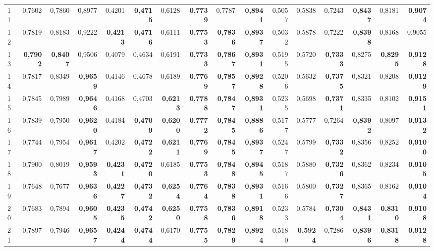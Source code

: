\begin{table}[htp!]
\begin{adjustwidth}{-2cm}{}
\begin{tabular}{ l | *{15}{| r}}
11	&	0,7602	&	0,7860	&	0,8977	&	0,4201	&	\textbf{0,4715}	&	0,6128	&	\textbf{0,7739}	&	0,7787	&	\textbf{0,8941}	&	0,5057	&	0,5838	&	0,7243	&	\textbf{0,8437}	&	0,8181	&	\textbf{0,9074}	\\
12	&	0,7819	&	0,8183	&	0,9222	&	\textbf{0,4213}	&	\textbf{0,4716}	&	0,6111	&	\textbf{0,7753}	&	\textbf{0,7836}	&	\textbf{0,8937}	&	0,5032	&	0,5878	&	0,7222	&	\textbf{0,8398}	&	0,8168	&	0,9055	\\
13	&	\textbf{0,7902}	&	\textbf{0,8407}	&	0,9506	&	0,4079	&	0,4634	&	0,6191	&	\textbf{0,7733}	&	\textbf{0,7867}	&	\textbf{0,8931}	&	0,5195	&	0,5720	&	\textbf{0,7333}	&	0,8275	&	\textbf{0,8295}	&	\textbf{0,9128}	\\
14	&	0,7817	&	0,8349	&	\textbf{0,9659}	&	0,4146	&	0,4678	&	0,6189	&	\textbf{0,7769}	&	\textbf{0,7857}	&	\textbf{0,8928}	&	0,5206	&	0,5632	&	\textbf{0,7375}	&	0,8321	&	0,8208	&	\textbf{0,9129}	\\
15	&	0,7845	&	0,7989	&	\textbf{0,9646}	&	0,4168	&	0,4703	&	\textbf{0,6213}	&	\textbf{0,7788}	&	\textbf{0,7847}	&	\textbf{0,8931}	&	0,5235	&	0,5698	&	\textbf{0,7371}	&	0,8335	&	0,8102	&	\textbf{0,9151}	\\
16	&	0,7839	&	0,7950	&	\textbf{0,9620}	&	0,4184	&	\textbf{0,4709}	&	\textbf{0,6200}	&	\textbf{0,7772}	&	\textbf{0,7845}	&	\textbf{0,8886}	&	0,5177	&	0,5777	&	0,7264	&	\textbf{0,8392}	&	0,8097	&	\textbf{0,9132}	\\
17	&	0,7744	&	0,7954	&	\textbf{0,9617}	&	0,4202	&	\textbf{0,4722}	&	\textbf{0,6211}	&	\textbf{0,7769}	&	\textbf{0,7845}	&	\textbf{0,8937}	&	0,5247	&	0,5799	&	\textbf{0,7332}	&	0,8356	&	0,8252	&	\textbf{0,9100}	\\
18	&	0,7900	&	0,8019	&	\textbf{0,9593}	&	\textbf{0,4231}	&	\textbf{0,4720}	&	0,6185	&	\textbf{0,7753}	&	\textbf{0,7848}	&	\textbf{0,8945}	&	0,5187	&	0,5880	&	\textbf{0,7326}	&	0,8362	&	0,8234	&	\textbf{0,9105}	\\
19	&	0,7648	&	0,7677	&	\textbf{0,9636}	&	\textbf{0,4227}	&	\textbf{0,4732}	&	\textbf{0,6254}	&	\textbf{0,7764}	&	\textbf{0,7838}	&	\textbf{0,8931}	&	0,5166	&	0,5800	&	\textbf{0,7327}	&	0,8365	&	0,8162	&	\textbf{0,9104}	\\
20	&	0,7683	&	0,7894	&	\textbf{0,9605}	&	\textbf{0,4235}	&	\textbf{0,4742}	&	\textbf{0,6250}	&	\textbf{0,7758}	&	\textbf{0,7836}	&	\textbf{0,8918}	&	0,5233	&	0,5784	&	\textbf{0,7304}	&	\textbf{0,8431}	&	\textbf{0,8310}	&	\textbf{0,9108}	\\
21	&	0,7897	&	0,7946	&	\textbf{0,9657}	&	\textbf{0,4244}	&	\textbf{0,4744}	&	0,6170	&	\textbf{0,7755}	&	\textbf{0,7829}	&	\textbf{0,8924}	&	0,5180	&	\textbf{0,5924}	&	0,7286	&	\textbf{0,8396}	&	\textbf{0,8318}	&	\textbf{0,9128}	\\

\end{tabular}
\end{adjustwidth}
\end{table}

